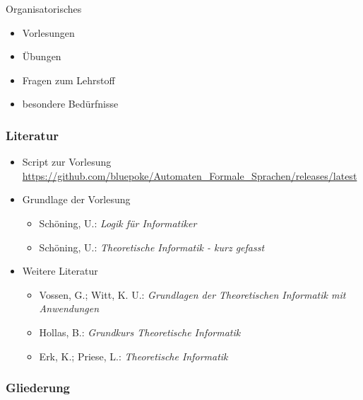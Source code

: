 \begin{frame}
	\titlepage
\end{frame}


\begin{frame}{Organisatorisches}
	\begin{itemize}
		\item Vorlesungen
		\item Übungen
		\item Fragen zum Lehrstoff
		\item besondere Bedürfnisse
	\end{itemize}
\end{frame}

\AtBeginSection{
	\begin{frame}
		\sectionpage
		\tableofcontents[sectionstyle=hide/hide,subsectionstyle=show/show/hide]
	\end{frame}
}

\begin{frame}
	\frametitle{Literatur}
	\begin{itemize}
		\item Script zur Vorlesung \\
		{\small \url{https://github.com/bluepoke/Automaten_Formale_Sprachen/releases/latest}}
		\item Grundlage der Vorlesung
		\begin{itemize}
			\item Schöning, U.: \textit{Logik für Informatiker}
			\item Schöning, U.: \textit{Theoretische Informatik - kurz gefasst}
		\end{itemize}
		\item Weitere Literatur
		\begin{itemize}
			\item Vossen, G.; Witt, K. U.: \textit{Grundlagen der Theoretischen Informatik mit Anwendungen}
			\item Hollas, B.: \textit{Grundkurs Theoretische Informatik}
			\item Erk, K.;  Priese, L.: \textit{Theoretische Informatik}
		\end{itemize}
	\end{itemize}
\end{frame}

\begin{frame}
	\frametitle{Gliederung}
	\tableofcontents
\end{frame}